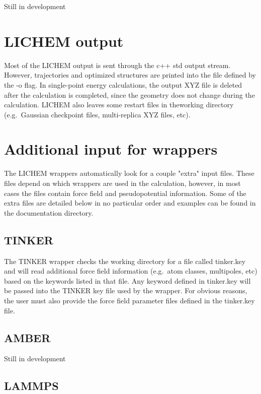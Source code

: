 \documentclass[12pt]{report}
\begin{document}
{\color{red}Still in development}

\section{LICHEM output}

Most of the LICHEM output is sent through the c++ std output stream.
However, trajectories and optimized structures are printed into the file
defined by the -o flag.
In single-point energy calculations, the output XYZ file is deleted after the
calculation is completed, since the geometry does not change during the
calculation.
LICHEM also leaves some restart files in theworking directory (e.g.\ Gaussian
checkpoint files, multi-replica XYZ files, etc).

\section{Additional input for wrappers}

The LICHEM wrappers automatically look for a couple "extra" input files.
These files depend on which wrappers are used in the calculation, however, in
most cases the files contain force field and pseudopotential information.
Some of the extra files are detailed below in no particular order and examples
can be found in the documentation directory.

\subsection{TINKER}

The TINKER wrapper checks the working directory for a file called tinker.key
and will read additional force field information (e.g.\ atom classes,
multipoles, etc) based on the keywords listed in that file.
Any keyword defined in tinker.key will be passed into the TINKER key file used
by the wrapper.
For obvious reasons, the user must also provide the force field parameter
files defined in the tinker.key file.

\subsection{AMBER}

{\color{red}Still in development}

\subsection{LAMMPS}
\end{document}
